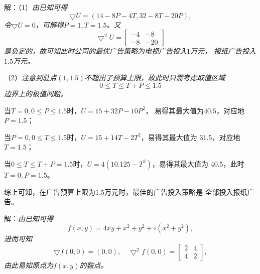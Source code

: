 \begin{frame}
	\linespread{1.5}
\end{frame}

\begin{frame}
	\linespread{1.5}
	
	\small 解：（1）\it 由已知可得
	$$\bigtriangledown U=(14-8P-4T,32-8T-20P),$$
	令$\bigtriangledown U=0$，可解得$P=1,T=1.5$。又
	$$\bigtriangledown^2U=\left[\begin{array}{cc}
		-4 & -8 \\ -8 & -20
	\end{array}\right]$$
	是负定的，故可知此时公司的最优广告策略为电视广告投入$1$万元，
	报纸广告投入$1.5$万元。
\end{frame}

\begin{frame}
	\linespread{1.4}
	
	\small （2）\it 注意到驻点$(1,1.5)$不超出了预算上限，故此时只需考虑取值区域
	$$0\leq T\leq T+P\leq 1.5$$
	边界上的极值问题。
	
	当$T=0,0\leq P\leq 1.5$时，$U=15+32P-10P^2$，
	易得其最大值为$40.5$，对应地$P=1.5$；
	
	当$P=0,0\leq T\leq 1.5$时，$U=15+14T-2T^2$，易得其最大值为
	$31.5$，对应地$T=1.5$；
	
	当$0\leq T\leq T+P=1.5$时，$U=4(10.125-T^2)$，易得其最大值为
	$40.5$，此时$T=0,P=1.5$。
	
	综上可知，在广告预算上限为$1.5$万元时，最佳的广告投入策略是
	全部投入报纸广告。\fin
\end{frame}

\begin{frame}
	\linespread{1.5}
	\pause

	\small 解：\it 由已知可得
	$$f(x,y)=4xy+x^2+y^2+\circ(x^2+y^2),$$
	进而可知
	$$\bigtriangledown f(0,0)=(0,0),\quad
	\bigtriangledown^2f(0,0)=\left[\begin{array}{cc}
		2 & 4 \\ 4 & 2
	\end{array}\right],$$
	由此易知原点为$f(x,y)$的鞍点。\fin
\end{frame}

